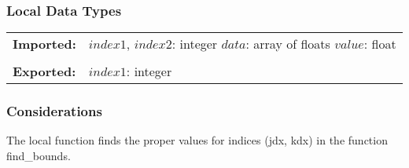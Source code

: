 \documentclass[12pt]{article}
\begin{document}
\subsubsection{Local Data Types}

\begin{tabular}{l p{}}
\textbf{Imported:} & $index1$, $index2$: integer \newline $data$: array of floats \newline $value$: float \\ \\
\textbf{Exported:} & $index1$: integer
\end{tabular}

\subsubsection{Considerations}

The local function finds the proper values for indices (jdx, kdx) in the function find\_bounds. 
\end{document}
